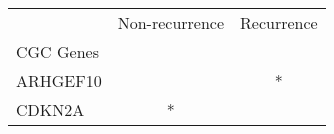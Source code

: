 \begin{tabular}{lcc}
\toprule
{} & Non-recurrence & Recurrence \\
CGC Genes &                &            \\
\midrule
ARHGEF10  &                &          * \\
CDKN2A    &              * &            \\
\bottomrule
\end{tabular}
